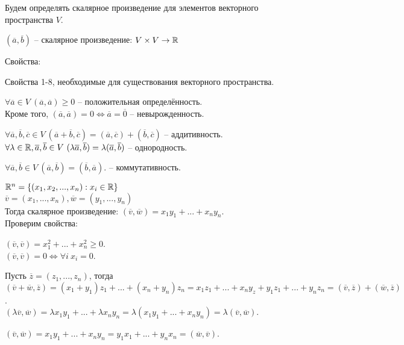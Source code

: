 	Будем определять скалярное произведение для элементов векторного пространства $V$.
	
	\begin{Def}
	  $(\overline{a}, \overline{b})$ -- скалярное произведение: $V \times V \to \mathbb{R}$
	\end{Def}
	
	Свойства:
	\begin{MyList}
		\item Свойства 1-8, необходимые для существования векторного пространства.
		\item $\forall \overline{a} \in V \ (\overline{a}, \overline{a}) \geqslant 0$ -- положительная определённость. \\
		Кроме того, $(\overline{a}, \overline{a}) = 0 \Leftrightarrow \overline{a} = \overline{0}$ -- невырожденность.
		\item $\forall \overline{a}, \overline{b}, \overline{c} \in V \ (\overline{a} + \overline{b}, \overline{c}) = (\overline{a}, \overline{c}) + (\overline{b}, \overline{c})$ -- аддитивность.\\
		$\forall \lambda \in \mathbb{R}, \overline{a}, \overline{b} \in V \ (\lambda \overline{a}, \overline{b}) = \lambda(\overline{a}, \overline{b})$ -- однородность.
		\item $\forall \overline{a}, \overline{b} \in V \ (\overline{a}, \overline{b}) = (\overline{b}, \overline{a})$. -- коммутативность.
	\end{MyList}
  
	\begin{Example}
	  $\mathbb{R}^n = \{ (x_1, x_2, ..., x_n): x_i \in \mathbb{R} \}$ \\
	  $\overline{v} = (x_1, ..., x_n), \overline{w} = (y_1, ..., y_n)$ \\
	  Тогда скалярное произведение: $(\overline{v}, \overline{w}) = x_1 y_1 + ... + x_n y_n.$ \\
	  Проверим свойства: 
	  \begin{MyList}
		\item $(\overline{v}, \overline{v}) = x_1^2 + ... + x_n^2 \geqslant 0$.\\
		$(\overline{v}, \overline{v}) = 0 \Leftrightarrow \forall i \ x_i = 0$.
		\item Пусть $ \overline{z} = (z_1, ..., z_n)$, тогда $(\overline{v} + \overline{w}, \overline{z}) = (x_1 + y_1)z_1 + ... + (x_n + y_n)z_n = x_1 z_1 + ... + x_n y_z + y_1 z_1 + ... + y_n z_n = (\overline{v}, \overline{z}) + (\overline{w}, \overline{z})$.\\
		$(\lambda \overline{v}, \overline{w}) = \lambda x_1 y_1 + ... + \lambda x_n y_n = \lambda (x_1 y_1 + ... + x_n y_n) = \lambda(\overline{v}, \overline{w})$.
		\item $(\overline{v}, \overline{w}) = x_1 y_1 + ... + x_n y_n = y_1 x_1 + ... + y_n x_n = (\overline{w}, \overline{v})$.
	  \end{MyList}
	\end{Example}
  
